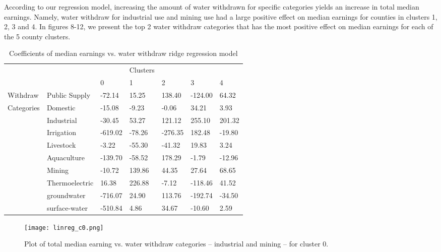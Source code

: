 \documentclass{article}
\begin{document}
According to our regression model, increasing  
 the amount of water withdrawn for 
 specific categories yields an increase in total median earnings. Namely, water withdraw for industrial use and mining use had a large positive effect on median earnings for counties in clusters 1, 2, 3 and 4. In figures 8-12, 
 we present the top 2 water withdraw categories that has the most positive effect on median earnings for each of the 5 county clusters. 
 
 

\begin{table}[hbt!]
  \caption{Coefficients of median earnings vs. water withdraw ridge regression model}
  \label{sample-table}
  \centering
  \begin{tabular}{l|l|lllll}
    \toprule
    &&&Clusters&&& \\
    \cmidrule(r){3-7}
           && 0     &1 & 2&3 & 4  \\
    \midrule
 Withdraw & Public Supply   & -72.14   & 15.25  &   138.40  & -124.00 & 64.32 \\   
  Categories & Domestic   &  -15.08 & -9.23  & -0.06   &   34.21 & 3.93 \\
   & Industrial &  -30.45 & 53.27 & 121.12 &  255.10  &  201.32 \\
   & Irrigation & -619.02  & -78.26 &  -276.35 & 182.48 & -19.80 \\ 
   & Livestock &  -3.22& -55.30 &  -41.32  &   19.83 &  3.24\\
   & Aquaculture &  -139.70   &  -58.52 & 178.29  &    -1.79  &  -12.96\\  
   & Mining & -10.72  &  139.86   &  44.35 &  27.64 & 68.65 \\
   & Thermoelectric &  16.38  & 226.88 & -7.12 & -118.46  &  41.52  \\
   & groundwater & -716.07  &  24.90  &   113.76 &  -192.74 & -34.50  \\
   & surface-water &    -510.84 &  4.86 &  34.67 & -10.60 &  2.59\\
    \bottomrule
  \end{tabular}
\end{table}



\begin{figure}[hbt!]
    \centering
    \texttt{[image: linreg\_c0.png]}
    \caption{Plot of total median earning vs. water withdraw categories -- industrial and mining -- for cluster 0.}
    \label{fig:my_label}
\end{figure}
\end{document}
